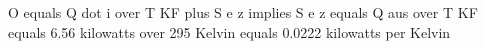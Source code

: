O equals Q dot i over T KF plus S e z implies S e z equals Q aus over T KF equals 6.56 kilowatts over 295 Kelvin equals 0.0222 kilowatts per Kelvin